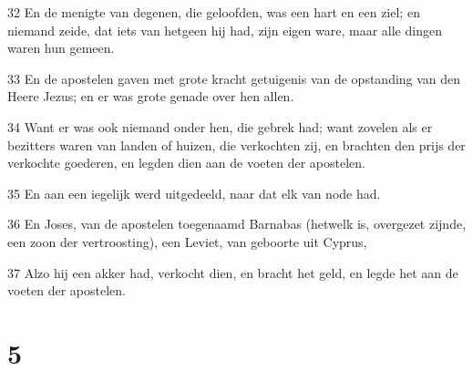 \par 32 En de menigte van degenen, die geloofden, was een hart en een ziel; en niemand zeide, dat iets van hetgeen hij had, zijn eigen ware, maar alle dingen waren hun gemeen.
\par 33 En de apostelen gaven met grote kracht getuigenis van de opstanding van den Heere Jezus; en er was grote genade over hen allen.
\par 34 Want er was ook niemand onder hen, die gebrek had; want zovelen als er bezitters waren van landen of huizen, die verkochten zij, en brachten den prijs der verkochte goederen, en legden dien aan de voeten der apostelen.
\par 35 En aan een iegelijk werd uitgedeeld, naar dat elk van node had.
\par 36 En Joses, van de apostelen toegenaamd Barnabas (hetwelk is, overgezet zijnde, een zoon der vertroosting), een Leviet, van geboorte uit Cyprus,
\par 37 Alzo hij een akker had, verkocht dien, en bracht het geld, en legde het aan de voeten der apostelen.

\chapter{5}

